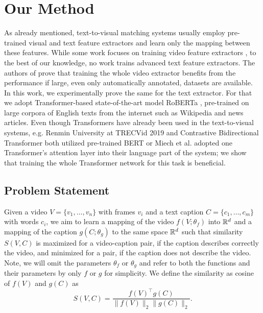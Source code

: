 \section{Our Method}\label{sec:chap2ourmethod}
As already mentioned, text-to-visual matching systems usually employ pre-\linebreak[4]trained visual and text feature extractors and learn only the mapping between these features. While some work focuses on training video feature extractors \cite{Miech_2020_CVPR}, to the best of our knowledge, no work trains advanced text feature extractors. The authors of \cite{Miech_2020_CVPR} prove that training the whole video extractor benefits from the performance if large, even only automatically annotated, datasets are available. In this work, we experimentally prove the same for the text extractor. For that we adopt Transformer-based \cite{AttentionisAllyouNeed} state-of-the-art model RoBERTa \cite{RoBERTa}, pre-trained on large corpora of English texts from the internet such as Wikipedia and news articles. Even though Transformers have already been used in the text-to-visual systems, e.g. Renmin University at TRECVid 2019 \cite{li2019renmin} and Contrastive Bidirectional Transformer \cite{ContrastiveBidirectionalTransformer} both utilized pre-trained BERT or Miech et al. \cite{Miech_2020_CVPR} adopted one Transformer's attention layer into their language part of the system; we show that training the whole Transformer network for this task is beneficial.

\subsection{Problem Statement} Given a video $V=\{v_1, \ldots, v_n\}$ with frames $v_i$ and a text caption $C=\{c_1,\ldots,c_m\}$ with words $c_i$, we aim to learn a mapping of the video $f(V; \theta_f)$ into $\mathbb{R}^d$ and a mapping of the caption $g(C; \theta_g)$ to the same space $\mathbb{R}^d$ such that similarity $S(V, C)$ is maximized for a video-caption pair, if the caption describes correctly the video, and minimized for a pair, if the caption does not describe the video. Note, we will omit the parameters $\theta_f$ or $\theta_g$ and refer to both the functions and their parameters by only $f$ or $g$ for simplicity. We define the similarity as cosine of $f(V)$ and $g(C)$ as
\begin{equation}
    S(V, C)=\frac{f(V)^\top g(C)}{\|f(V)\|_2\|g(C)\|_2}.
\end{equation}


